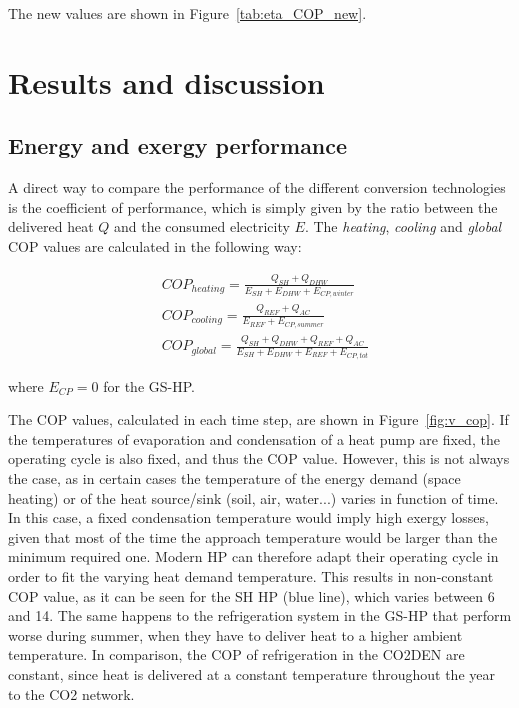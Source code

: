 \documentclass{article}
\begin{document}


The new values are shown in Figure~\ref{tab:eta_COP_new}.

\clearpage
\newpage
\section{Results and discussion}

\subsection{Energy and exergy performance}\label{ss:perf}
A direct way to compare the performance of the different conversion technologies is the coefficient of performance, which is simply given by the ratio between the delivered heat $Q$ and the consumed electricity $E$. The \textit{heating}, \textit{cooling} and \textit{global} COP values are calculated in the following way:

\begin{align}
& COP_{heating} = \frac{Q_{SH}+ Q_{DHW}}{E_{SH} + E_{DHW} + E_{CP,winter}} \\
& COP_{cooling} = \frac{Q_{REF} + Q_{AC}}{E_{REF} + E_{CP,summer}} \\
& COP_{global} = \frac{Q_{SH}+ Q_{DHW} + Q_{REF} + Q_{AC}}{E_{SH} + E_{DHW} + E_{REF} + E_{CP,tot}}
\end{align}

where $E_{CP} = 0$ for the GS-HP. 

The COP values, calculated in each time step, are shown in Figure~\ref{fig:v_cop}. If the temperatures of evaporation and condensation of a heat pump are fixed, the operating cycle is also fixed, and thus the COP value. However, this is not always the case, as in certain cases the temperature of the energy demand (space heating) or of the heat source/sink (soil, air, water...) varies in function of time. In this case, a fixed condensation temperature would imply high exergy losses, given that most of the time the approach temperature would be larger than the minimum required one. Modern HP can therefore adapt their operating cycle in order to fit the varying heat demand temperature. This results in non-constant COP value, as it can be seen for the SH HP (blue line), which varies between 6 and 14. The same happens to the refrigeration system in the GS-HP that perform worse during summer, when they have to deliver heat to a higher ambient temperature. In comparison, the COP of refrigeration in the CO2DEN are constant, since heat is delivered at a constant temperature throughout the year to the CO2 network.
\end{document}
